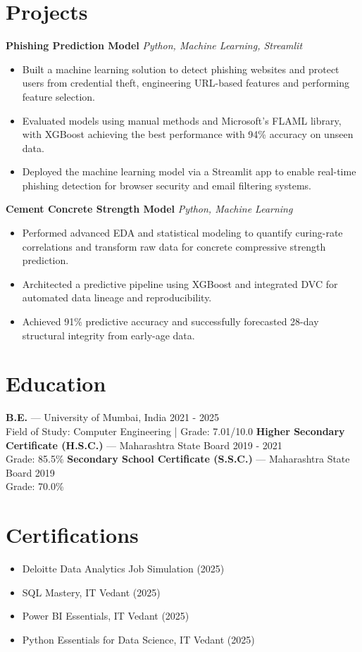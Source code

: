 \documentclass[10pt,a4paper]{article}
\begin{document}
\section*{Projects}

\textbf{Phishing Prediction Model} \hfill \textit{Python, Machine Learning, Streamlit}\\
\begin{itemize}
\item Built a machine learning solution to detect phishing websites and protect users from credential theft, engineering URL-based features and performing feature selection.
\item Evaluated models using manual methods and Microsoft's FLAML library, with XGBoost achieving the best performance with 94\% accuracy on unseen data.
\item Deployed the machine learning model via a Streamlit app to enable real-time phishing detection for browser security and email filtering systems.
\end{itemize}
\vspace{1pt}
\textbf{Cement Concrete Strength Model} \hfill \textit{Python, Machine Learning}\\
\begin{itemize}
\item Performed advanced EDA and statistical modeling to quantify curing-rate correlations and transform raw data for concrete compressive strength prediction.
\item Architected a predictive pipeline using XGBoost and integrated DVC for automated data lineage and reproducibility.
\item Achieved 91\% predictive accuracy and successfully forecasted 28-day structural integrity from early-age data.
\end{itemize}
\vspace{1pt}

\section*{Education}

\textbf{B.E.} --- University of Mumbai, India \hfill 2021 - 2025
\\ Field of Study: Computer Engineering | Grade: 7.01/10.0
\vspace{1pt}
\textbf{Higher Secondary Certificate (H.S.C.)} --- Maharashtra State Board \hfill 2019 - 2021
\\ Grade: 85.5\%
\vspace{1pt}
\textbf{Secondary School Certificate (S.S.C.)} --- Maharashtra State Board \hfill 2019
\\ Grade: 70.0\%
\vspace{1pt}

\section*{Certifications}
\begin{itemize}[itemsep=0pt, topsep=1pt]
\item Deloitte Data Analytics Job Simulation (2025)
\item SQL Mastery, IT Vedant (2025)
\item Power BI Essentials, IT Vedant (2025)
\item Python Essentials for Data Science, IT Vedant (2025)
\end{itemize}
\end{document}
